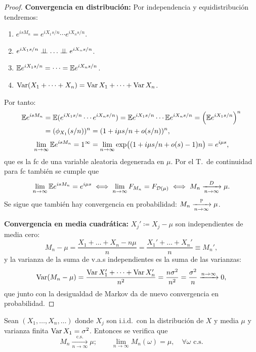 \begin{proof}
\textbf{Convergencia en distribución:} Por independencia y equidistribución tendremos:
\begin{enumerate}
  \item $e^{isM_n} = e^{iX_1 s/n} \cdots e^{iX_n s/n}$.
  \item $e^{iX_1 s/n} \indep \dots \indep e^{iX_n s/n}$.
  \item $\mathbb{E} e^{iX_1 s/n} = \dots = \mathbb{E} e^{iX_n s/n}$.
  \item $\operatorname{Var}(X_1 + \dots + X_n) = \operatorname{Var} X_1 + \dots + \operatorname{Var} X_n$.
\end{enumerate}
Por tanto:
\begin{align*}
  \mathbb{E} e^{isM_n} &= \mathbb{E}(e^{iX_1 s/n} \cdots e^{iX_n s/n}) = \mathbb{E} e^{iX_1 s/n} \cdots \mathbb{E} e^{iX_n s/n} = \left(\mathbb{E} e^{iX_1 s/n}\right)^n \\
               &= (\phi_{X_1}(s/n))^n = (1 + i\mu s/n + o(s/n))^n,
\end{align*}
\[
  \lim_{n\to\infty} \mathbb{E} e^{isM_n} = 1^\infty = \lim_{n\to\infty} \exp\bigl((1 + i\mu s/n + o(s) - 1)n\bigr) = e^{i\mu s},
\]
que es la fc de una variable aleatoria degenerada en $\mu$. Por el T.\ de continuidad para fc también se cumple que
\[
  \lim_{n\to\infty} \mathbb{E} e^{isM_n} = e^{i\mu s} \iff \lim_{n\to\infty} F_{M_n} = F_{\mathcal{D}(\mu)} \iff M_n \xrightarrow[n\to\infty]{D} \mu.
\]
Se sigue que también hay convergencia en probabilidad: $M_n \xrightarrow[n\to\infty]{\mathbb{P}} \mu$.

\textbf{Convergencia en media cuadrática:} $X_j' \coloneqq X_j - \mu$ son independientes de media cero:
\[
  M_n - \mu = \frac{X_1 + \dots + X_n - n\mu}{n} = \frac{X_1' + \dots + X_n'}{n} \equiv M_n',
\]
y la varianza de la suma de v.a.s independientes es la suma de las varianzas:
\[
  \operatorname{Var}(M_n - \mu) = \frac{\operatorname{Var} X_1' + \dots + \operatorname{Var} X_n'}{n^2} = \frac{n\sigma^2}{n^2} = \frac{\sigma^2}{n} \xrightarrow{n\to\infty} 0,
\]
que junto con la desigualdad de Markov da de nuevo convergencia en probabilidad.
\end{proof}

\begin{teorema}

Sean $(X_1, \dots, X_n, \dots)$ donde $X_j$ son i.i.d.\ con la distribución de $X$ y media $\mu$ y varianza finita $\operatorname{Var} X_1 = \sigma^2$. Entonces se verifica que
\[
  M_n \xrightarrow[n\to\infty]{\text{c.s.}} \mu; \qquad \lim_{n\to\infty} M_n(\omega) = \mu, \quad \forall \omega \text{ c.s.}
\]
\end{teorema}

